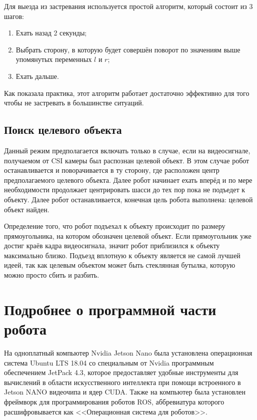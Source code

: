 Для выезда из застревания используется простой алгоритм, который состоит из 3 шагов:

\begin{enumerate}
\item Ехать назад 2 секунды;
\item Выбрать сторону, в которую будет совершён поворот по значениям выше упомянутых переменных $l$ и $r$;
\item Ехать дальше.
\end{enumerate}

Как показала практика, этот алгоритм работает достаточно эффективно для того чтобы не застревать в большинстве ситуаций.

\subsection{Поиск целевого объекта}

Данный режим предполагается включать только в случае, если на видеосигнале, получаемом от CSI камеры был распознан целевой объект. В этом случае робот останавливается и поворачивается в ту сторону, где расположен центр предполагаемого целевого объекта. Далее робот начинает ехать вперёд и по мере необходимости продолжает центрировать шасси до тех пор пока не подъедет к объекту. Далее робот останавливается, конечная цель робота выполнена: целевой объект найден.

Определение того, что робот подъехал к объекту происходит по размеру прямоугольника, на котором обозначен целевой объект. Если прямоугольник уже достиг краёв кадра видеосигнала, значит робот приблизился к объекту максимально близко. Подъезд вплотную к объекту является не самой лучшей идеей, так как целевым объектом может быть стеклянная бутылка, которую можно просто сбить и разбить. 

\section{Подробнее о программной части робота}
На одноплатный компьютер Nvidia Jetson Nano была установлена операционная система Ubuntu LTS 18.04 со специальным от Nvidia программным обеспечением JetPack 4.3, которое предоставляет удобные инструменты для вычислений в области искусственного интеллекта при помощи встроенного в Jetson NANO видеочипа и ядер CUDA. Также на компьютер была установлен фреймворк для программирования роботов ROS, аббревиатура которого расшифровывается как <<Операционная система для роботов>>.

